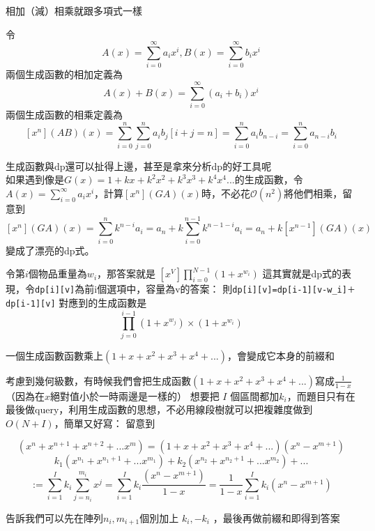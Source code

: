 相加（減）相乘就跟多項式一樣
\begin{definition}
令
$$A(x)=\sum_{i=0}^{\infty}a_ix^i,B(x)=\sum_{i=0}^{\infty}b_ix^i$$
兩個生成函數的相加定義為
$$A(x)+B(x)=\sum_{i=0}^{\infty}(a_i+b_i)x^i$$
兩個生成函數的相乘定義為
$$[x^n](AB)(x)=\sum_{i=0}^n\sum_{j=0}^na_ib_j[i+j=n]=\sum_{i=0}^n a_ib_{n-i}=\sum_{i=0}^n a_{n-i}b_i$$
\end{definition}

生成函數與dp還可以扯得上邊，甚至是拿來分析dp的好工具呢\\
如果遇到像是$G(x)=1+kx+k^2x^2+k^3x^3+k^4x^4...$的生成函數，令$A(x)=\sum_{i=0}^{\infty}a_ix^i$，計算$[x^n](GA)( x)$時，不必花$\mathcal{O}(n^2)$將他們相乘，留意到
$$[x^n]\left(GA\right)\left( x\right)=\sum_{i=0}^{n}k^{n-i}a_{i}=a_n+k\sum_{i=0}^{n-1}k^{n-1-i}a_i=a_n+k[x^{n-1}]\left(GA\right)\left( x\right)$$變成了漂亮的dp式。

令第$i$個物品重量為$w_i$，那答案就是
$[x^V]\prod_{i=0}^{N-1}(1+x^{w_i})$
這其實就是dp式的表現，令\lstinline{dp[i][v]}為前i個選項中，容量為v的答案：
則\lstinline{dp[i][v]=dp[i-1][v-w_i]＋dp[i-1][v]}
對應到的生成函數是
$$\prod_{j=0}^{i-1}(1+x^{w_j})\times (1+x^{w_i})$$
\begin{theorem}
一個生成函數函數乘上$(1+x+x^2+x^3+x^4+...)$，會變成它本身的前綴和
\end{theorem}

考慮到幾何級數，有時候我們會把生成函數$(1+x+x^2+x^3+x^4+...)$寫成$\frac 1 {1-x}$（因為在$x$絕對值小於一時兩邊是一樣的）
想要把 $I$ 個區間都加$k_i$，而題目只有在最後做query，利用生成函數的思想，不必用線段樹就可以把複雜度做到$O\left(N + I \right)$，簡單又好寫：
留意到

$$        (x^n+x^{n+1}+x^{n+2}+...x^{m})=(1+x+x^2+x^3+x^4+...)(x^n-x^{m+1})$$
$$k_1(x^{n_1}+x^{{n_1}+1}+...x^{m_1})+k_2(x^{n_2}+x^{{n_2}+1}+...x^{m_2})+...$$
   $$ :=\sum^I_{i=1}k_i\sum^{m_i}_{j={n_i}}x^j=\sum^I_{i=1}k_i\frac{(x^n-x^{m+1})}{1-x}=\frac{1}{1-x}\sum^I_{i=1}k_i(x^n-x^{m+1})$$

告訴我們可以先在陣列$n_i,m_{i+1}$個別加上 $k_i,-k_i$ ，最後再做前綴和即得到答案


